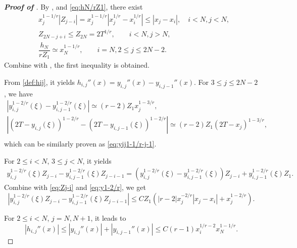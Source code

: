 \documentclass{amsart}
\theoremstyle{definition}
\theoremstyle{remark}
\numberwithin{equation}{section}
\begin{document}
\begin{proof} [\bf Proof of ]
  By ,  and \eqref{eq:hN/rZ1}, there exist
  \begin{equation} \label{eq:Zj-i}
  \begin{split}
    &x_j^{1-1/r} |Z_{j-i}| = x_j^{1-1/r} |x_j^{1/r} - x_i^{1/r}| \le |x_j - x_i|, \quad i<N, j < N, \\
    &Z_{2N-j+i} \le Z_{2N} =  2 T^{1/r},                    \qquad i<N, j>N,    \\
    &\dfrac{h_N}{r Z_1} \simeq x_N^{1-1/r},      \qquad i=N, 2\le j \le 2N-2. 
  \end{split}
  \end{equation}
  Combine with , the first inequality is obtained.

  From \eqref{def:hij}, it yields $h_{i,j}''(x) = y_{i,j}''(x) - y_{i,j-1}''(x)$.
  For $3\le j \le 2N-2$, we have
  \begin{equation}   \label{eq:y1-2/r}
  \begin{gathered}
  |y_{i,j}^{1-2/r}(\xi) - y_{i,j-1}^{1-2/r}(\xi)| \simeq (r-2) Z_1 x_j^{1-3/r},  \\
  |(2T-y_{i,j}(\xi))^{1-2/r} - (2T-y_{i,j-1}(\xi))^{1-2/r}| \simeq (r-2) Z_1 (2T-x_j)^{1-3/r},  \\
  \end{gathered}
  \end{equation}
  which can be similarly proven as \eqref{eq:yij1-1/r-j-1}. 
    
  For \(2\le i<N\), \(3\le j<N\), it yields
  \begin{equation*} \label{eq:yij1-2/rZj-i-depart}
    \begin{aligned}
      y_{i,j}^{1-2/r}(\xi) Z_{j-i} - y_{i,j-1}^{1-2/r}(\xi) Z_{j-i-1}
      = \left( y_{i,j}^{1-2/r}(\xi) - y_{i,j-1}^{1-2/r}(\xi) \right) Z_{j-i} + y_{i, j-1}^{1-2/r}(\xi) Z_1.
    \end{aligned}
  \end{equation*}
  Combine with \eqref{eq:Zj-i} and \eqref{eq:y1-2/r}, we get
  \begin{equation*} \label{eq:yij1-2/rZj-i-}
    |y_{i,j}^{1-2/r}(\xi) Z_{j-i} - y_{i,j-1}^{1-2/r}(\xi) Z_{j-i-1}| \le C Z_1 \left( |r-2| x_j^{-2/r}|x_j - x_i| + x_j^{1-2/r}  \right).
  \end{equation*}
  
  For $2\le i < N$, \(j=N, N+1\), it leads to
      $$|h_{i,j}''(x)| \le |y_{i,j}''(x)| + |y_{i,j-1}''(x)| \le C (r-1) x_i^{1/r-2} x_N^{1-1/r}.$$



\end{proof}
\end{document}
